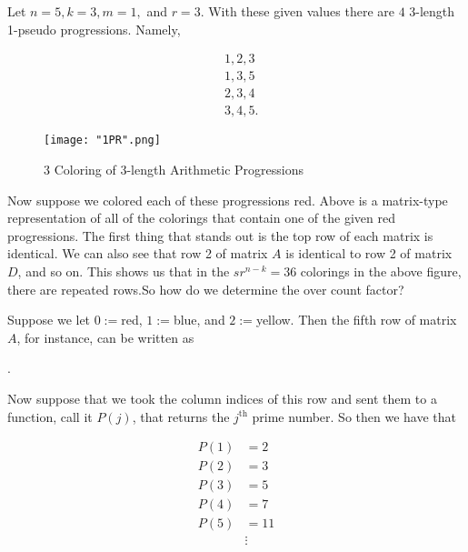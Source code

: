 \documentclass[12pt, a4paper]{article}
\begin{document}
Let $n=5, k=3, m=1,$ and $r=3$. With these given values there are $4$ 3-length 1-pseudo progressions. Namely,

\begin{equation*}
    \begin{split}
        &1,2,3 \\
        &1,3,5 \\
        &2,3,4 \\
        &3,4,5.
    \end{split}
\end{equation*}



\begin{figure}
    \hspace{10mm}
    \texttt{[image: "1PR".png]}
    \caption{3 Coloring of 3-length Arithmetic Progressions}
    \label{fig:my_label}
\end{figure}

\noindent Now suppose we colored each of these progressions red. Above is a matrix-type representation of all of the colorings that contain one of the given red progressions. The first thing that stands out is the top row of each matrix is identical. We can also see that row 2 of matrix $A$ is identical to row 2 of matrix $D$, and so on. This shows us that in the $sr^{n-k}=36$ colorings in the above figure, there are repeated rows.So how do we determine the over count factor?\par
Suppose we let $0:=$red, $1:=$blue, and $2:=$yellow. Then the fifth row of matrix $A$, for instance, can be written as 

\vspace{4mm}

\begin{center}
    .
\end{center}

\noindent Now suppose that we took the column indices of this row and sent them to a function, call it $P(j)$, that returns the $j^{\text{th}}$ prime number. So then we have that 

\begin{equation*}
    \begin{split}
        P(1) &= 2 \\
        P(2) &= 3 \\
        P(3) &= 5 \\
        P(4) &= 7 \\
        P(5) &= 11 \\
        &\vdots
    \end{split}
\end{equation*}
\end{document}
